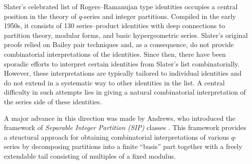 \documentclass[12pt]{amsart}
\theoremstyle{definition}
\theoremstyle{remark}
\numberwithin{equation}{section}
\begin{document}





Slater’s celebrated list of Rogers--Ramanujan type identities \cite{Slater1952} occupies a central position in the theory of $q$-series and integer partitions. Compiled in the early 1950s, it consists of 130 series--product identities with deep connections to partition theory, modular forms, and basic hypergeometric series. Slater’s original proofs relied on Bailey pair techniques and, as a consequence, do not provide combinatorial interpretations of the identities. Since then, there have been sporadic efforts to interpret certain identities from Slater’s list combinatorially. However, these interpretations are typically tailored to individual identities and do not extend in a systematic way to other identities in the list. A central difficulty in such attempts lies in giving a natural combinatorial interpretation of the series side of these identities. 

A major advance in this direction was made by Andrews, who introduced the framework of \emph{Separable Integer Partition (SIP)} classes \cite[Section $2$]{AndrewsSIP}. This framework provides a structural approach for obtaining combinatorial interpretations of various $q$-series by decomposing partitions into a finite ``basis'' part together with a freely extendable tail consisting of multiples of a fixed modulus.
\end{document}
